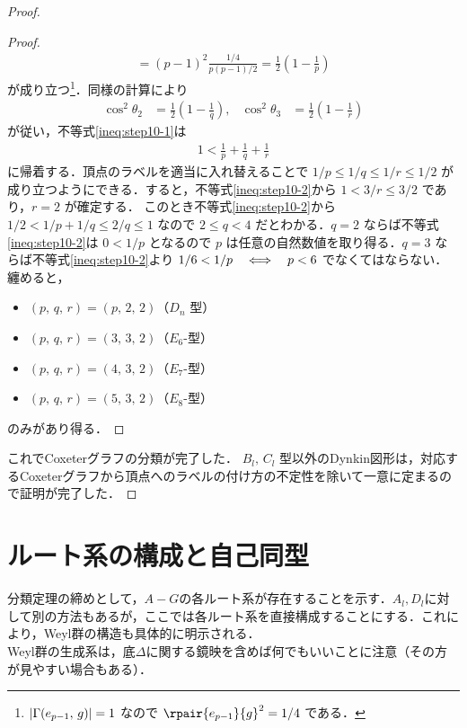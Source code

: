 \documentclass[rep_main]{subfiles}
\begin{document}
\begin{proof}
\begin{proof}
\begin{align}
			= (p-1)^2 \frac{1/4}{p(p-1)/2}
			= \frac{1}{2} \left( 1 - \frac{1}{p}\right) 
		\end{align}
		が成り立つ\footnote{$\abs{\Gamma(e_{p-1},\, g)} = 1$ なので $\rpair{e_{p-1}}{g}^2 = 1/4$ である．}．同様の計算により
		\begin{align}
			\cos^2 \theta_2 &= \frac{1}{2} \left( 1 - \frac{1}{q}\right), &\cos^2 \theta_3 &= \frac{1}{2} \left( 1 - \frac{1}{r}\right)
		\end{align}
		が従い，不等式\eqref{ineq:step10-1}は
		\begin{align}
			\label{ineq:step10-2}
			1 < \frac{1}{p} + \frac{1}{q} + \frac{1}{r}
		\end{align}
		に帰着する．頂点のラベルを適当に入れ替えることで $1/p \le 1/q \le 1/r \le 1/2$ が成り立つようにできる．すると，不等式\eqref{ineq:step10-2}から $1 < 3/r \le 3/2$ であり，$r = 2$ が確定する．
		このとき不等式\eqref{ineq:step10-2}から
		$1/2 < 1/p + 1/q \le 2/q \le 1$ 
		なので $2 \le q < 4$ だとわかる．$q = 2$ ならば不等式\eqref{ineq:step10-2}は $0 < 1/p$ となるので $p$ は任意の自然数値を取り得る．$q = 3$ ならば不等式\eqref{ineq:step10-2}より $1/6 < 1/p \quad \Longleftrightarrow \quad p < 6$ でなくてはならない．
		纏めると，
		\begin{itemize}
			\item $(p,\, q,\, r) = (p,\, 2,\, 2)$（$D_n$ 型）
			\item $(p,\, q,\, r) = (3,\, 3,\, 2)$（$E_{6}$-型）
			\item $(p,\, q,\, r) = (4,\, 3,\, 2)$（$E_{7}$-型）
			\item $(p,\, q,\, r) = (5,\, 3,\, 2)$（$E_{8}$-型）
		\end{itemize}
		のみがあり得る．
	\end{proof}
	これでCoxeterグラフの分類が完了した．
	$B_l,\, C_l$ 型以外のDynkin図形は，対応するCoxeterグラフから頂点へのラベルの付け方の不定性を除いて一意に定まるので証明が完了した．
\end{proof}


\section{ルート系の構成と自己同型}
分類定理の締めとして，$A - G$の各ルート系が存在することを示す．$A_l, D_l$に対して別の方法もあるが，ここでは各ルート系を直接構成することにする．これにより，Weyl群の構造も具体的に明示される．\\
Weyl群の生成系は，底$\Delta$に関する鏡映を含めば何でもいいことに注意（その方が見やすい場合もある）．
\end{document}
